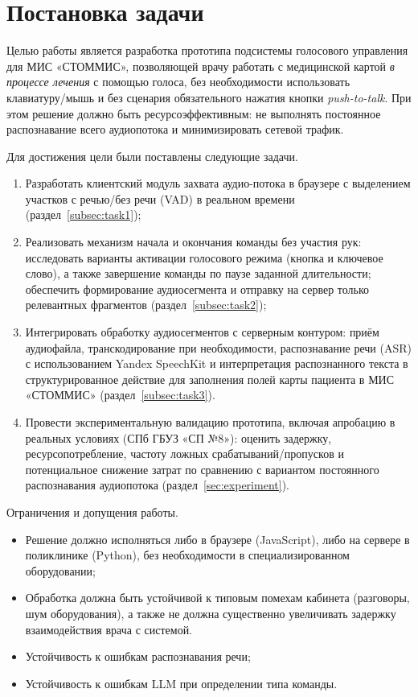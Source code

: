 
\clearpage

\section{Постановка задачи}
\label{sec:task}

Целью работы является разработка прототипа подсистемы голосового управления для МИС «СТОММИС», позволяющей врачу работать с медицинской картой \emph{в процессе лечения} с помощью голоса, без необходимости использовать клавиатуру/мышь и без сценария обязательного нажатия кнопки \emph{push-to-talk}.
При этом решение должно быть ресурсоэффективным: не выполнять постоянное распознавание всего аудиопотока и минимизировать сетевой трафик.

Для достижения цели были поставлены следующие задачи.
\begin{enumerate}
    \item Разработать клиентский модуль захвата аудио-потока в браузере с выделением участков с речью/без речи (VAD) в реальном времени (раздел~\ref{subsec:task1});
    \item Реализовать механизм начала и окончания команды без участия рук: исследовать варианты активации голосового режима (кнопка и ключевое слово), а также завершение команды по паузе заданной длительности; обеспечить формирование аудиосегмента и отправку на сервер только релевантных фрагментов (раздел~\ref{subsec:task2});
    \item Интегрировать обработку аудиосегментов с серверным контуром: приём аудиофайла, транскодирование при необходимости, распознавание речи (ASR) с использованием Yandex SpeechKit и интерпретация распознанного текста в структурированное действие для заполнения полей карты пациента в МИС «СТОММИС» (раздел~\ref{subsec:task3}).
    \item Провести экспериментальную валидацию прототипа, включая апробацию в реальных условиях (СПб ГБУЗ «СП №8»): оценить задержку, ресурсопотребление, частоту ложных срабатываний/пропусков и потенциальное снижение затрат по сравнению с вариантом постоянного распознавания аудиопотока (раздел~\ref{sec:experiment}).
\end{enumerate}

Ограничения и допущения работы.
\begin{itemize}
    \item Решение должно исполняться либо в браузере (JavaScript), либо на сервере в поликлинике (Python), без необходимости в специализированном оборудовании;
    \item Обработка должна быть устойчивой к типовым помехам кабинета (разговоры, шум оборудования), а также не должна существенно увеличивать задержку взаимодействия врача с системой.
    \item Устойчивость к ошибкам распознавания речи;
    \item Устойчивость к ошибкам LLM при определении типа команды.
\end{itemize}
